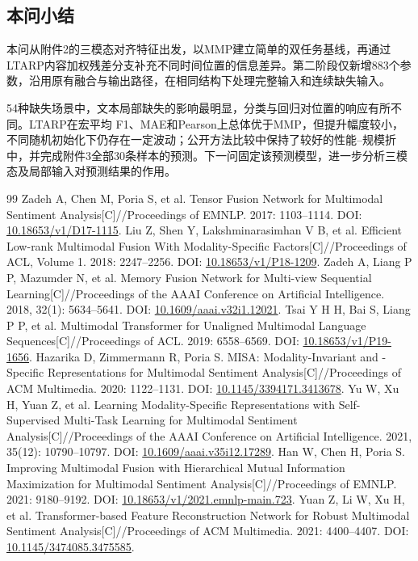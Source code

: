 \documentclass[UTF8,a4paper,11pt]{ctexart}
\newcommand{\QTwoParagraph}{\par\noindent\hspace*{2em}}
\newcounter{q2algorithm}
\begin{document}
\subsection{本问小结}\label{subsec:q2_summary}
\QTwoParagraph 本问从附件2的三模态对齐特征出发，以MMP建立简单的双任务基线，再通过LTARP内容加权残差分支补充不同时间位置的信息差异。第二阶段仅新增883个参数，沿用原有融合与输出路径，在相同结构下处理完整输入和连续缺失输入。

\QTwoParagraph 54种缺失场景中，文本局部缺失的影响最明显，分类与回归对位置的响应有所不同。LTARP在宏平均 F1、MAE和Pearson上总体优于MMP，但提升幅度较小，不同随机初始化下仍存在一定波动；公开方法比较中保持了较好的性能--规模折中，并完成附件3全部30条样本的预测。下一问固定该预测模型，进一步分析三模态及局部输入对预测结果的作用。

\clearpage
{\small
\begin{thebibliography}{99}
 Zadeh A, Chen M, Poria S, et al. Tensor Fusion Network for Multimodal Sentiment Analysis[C]//Proceedings of EMNLP. 2017: 1103--1114. DOI: \url{10.18653/v1/D17-1115}.
 Liu Z, Shen Y, Lakshminarasimhan V B, et al. Efficient Low-rank Multimodal Fusion With Modality-Specific Factors[C]//Proceedings of ACL, Volume 1. 2018: 2247--2256. DOI: \url{10.18653/v1/P18-1209}.
 Zadeh A, Liang P P, Mazumder N, et al. Memory Fusion Network for Multi-view Sequential Learning[C]//Proceedings of the AAAI Conference on Artificial Intelligence. 2018, 32(1): 5634--5641. DOI: \url{10.1609/aaai.v32i1.12021}.
 Tsai Y H H, Bai S, Liang P P, et al. Multimodal Transformer for Unaligned Multimodal Language Sequences[C]//Proceedings of ACL. 2019: 6558--6569. DOI: \url{10.18653/v1/P19-1656}.
 Hazarika D, Zimmermann R, Poria S. MISA: Modality-Invariant and -Specific Representations for Multimodal Sentiment Analysis[C]//Proceedings of ACM Multimedia. 2020: 1122--1131. DOI: \url{10.1145/3394171.3413678}.
 Yu W, Xu H, Yuan Z, et al. Learning Modality-Specific Representations with Self-Supervised Multi-Task Learning for Multimodal Sentiment Analysis[C]//Proceedings of the AAAI Conference on Artificial Intelligence. 2021, 35(12): 10790--10797. DOI: \url{10.1609/aaai.v35i12.17289}.
 Han W, Chen H, Poria S. Improving Multimodal Fusion with Hierarchical Mutual Information Maximization for Multimodal Sentiment Analysis[C]//Proceedings of EMNLP. 2021: 9180--9192. DOI: \url{10.18653/v1/2021.emnlp-main.723}.
 Yuan Z, Li W, Xu H, et al. Transformer-based Feature Reconstruction Network for Robust Multimodal Sentiment Analysis[C]//Proceedings of ACM Multimedia. 2021: 4400--4407. DOI: \url{10.1145/3474085.3475585}.

\end{thebibliography}}
\end{document}
